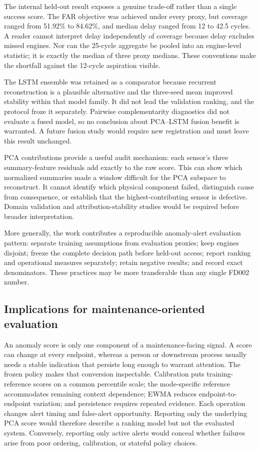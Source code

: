 \documentclass[11pt]{article}
\begin{document}
The internal held-out result exposes a genuine trade-off rather than a single success score. The FAR objective was achieved under every proxy, but coverage ranged from 51.92\% to 84.62\%, and median delay ranged from 12 to 42.5 cycles. A reader cannot interpret delay independently of coverage because delay excludes missed engines. Nor can the 25-cycle aggregate be pooled into an engine-level statistic; it is exactly the median of three proxy medians. These conventions make the shortfall against the 12-cycle aspiration visible.


The LSTM ensemble was retained as a comparator because recurrent reconstruction is a plausible alternative and the three-seed mean improved stability within that model family. It did not lead the validation ranking, and the protocol froze it separately. Pairwise complementarity diagnostics did not evaluate a fused model, so no conclusion about PCA--LSTM fusion benefit is warranted. A future fusion study would require new registration and must leave this result unchanged.


PCA contributions provide a useful audit mechanism: each sensor's three summary-feature residuals add exactly to the raw score. This can show which normalized summaries made a window difficult for the PCA subspace to reconstruct. It cannot identify which physical component failed, distinguish cause from consequence, or establish that the highest-contributing sensor is defective. Domain validation and attribution-stability studies would be required before broader interpretation.


More generally, the work contributes a reproducible anomaly-alert evaluation pattern: separate training assumptions from evaluation proxies; keep engines disjoint; freeze the complete decision path before held-out access; report ranking and operational measures separately; retain negative results; and record exact denominators. These practices may be more transferable than any single FD002 number.


\subsection{Implications for maintenance-oriented evaluation}


An anomaly score is only one component of a maintenance-facing signal. A score can change at every endpoint, whereas a person or downstream process usually needs a stable indication that persists long enough to warrant attention. The frozen policy makes that conversion inspectable. Calibration puts training-reference scores on a common percentile scale; the mode-specific reference accommodates remaining context dependence; EWMA reduces endpoint-to-endpoint variation; and persistence requires repeated evidence. Each operation changes alert timing and false-alert opportunity. Reporting only the underlying PCA score would therefore describe a ranking model but not the evaluated system. Conversely, reporting only active alerts would conceal whether failures arise from poor ordering, calibration, or stateful policy choices.
\end{document}
